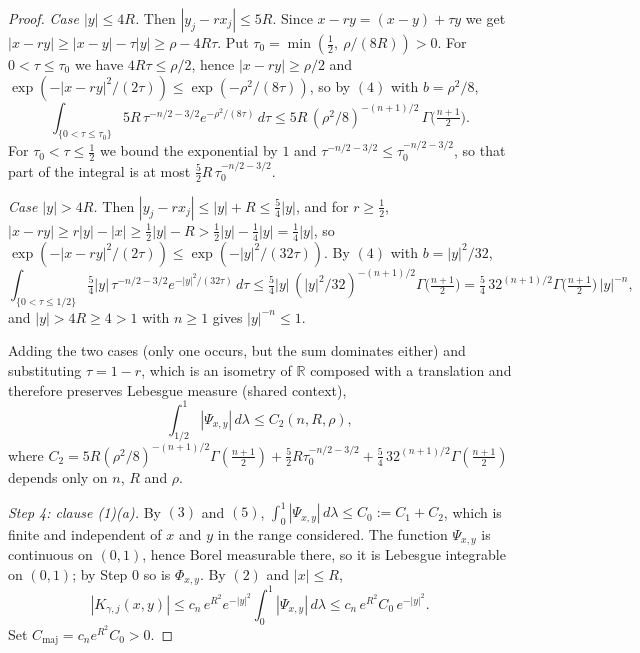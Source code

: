 \begin{proof}
\emph{Case $|y| \leq 4R$.}  Then $|y_j-rx_j| \leq 5R$.  Since
$x - ry = (x-y) + \tau y$ we get
$|x-ry| \geq |x-y| - \tau|y| \geq \rho - 4R\tau$.  Put
$\tau_0 = \min(\tfrac12,\ \rho/(8R)) > 0$.  For $0 < \tau \leq \tau_0$ we have
$4R\tau \leq \rho/2$, hence $|x-ry| \geq \rho/2$ and
$\exp(-|x-ry|^2/(2\tau)) \leq \exp(-\rho^2/(8\tau))$, so by $(4)$ with
$b = \rho^2/8$,
\[
  \int_{\{0<\tau\leq\tau_0\}} 5R\,\tau^{-n/2-3/2}e^{-\rho^2/(8\tau)}\,d\tau
    \leq 5R\,(\rho^2/8)^{-(n+1)/2}\,\Gamma\bigl(\tfrac{n+1}{2}\bigr) .
\]
For $\tau_0 < \tau \leq \tfrac12$ we bound the exponential by $1$ and
$\tau^{-n/2-3/2} \leq \tau_0^{-n/2-3/2}$, so that part of the integral is at
most $\tfrac52 R\,\tau_0^{-n/2-3/2}$.

\emph{Case $|y| > 4R$.}  Then $|y_j-rx_j| \leq |y| + R \leq \tfrac54|y|$, and
for $r \geq \tfrac12$,
$|x-ry| \geq r|y| - |x| \geq \tfrac12|y| - R > \tfrac12|y| - \tfrac14|y|
 = \tfrac14|y|$, so $\exp(-|x-ry|^2/(2\tau)) \leq \exp(-|y|^2/(32\tau))$.  By
$(4)$ with $b = |y|^2/32$,
\[
  \int_{\{0<\tau\leq 1/2\}}\tfrac54|y|\,\tau^{-n/2-3/2}e^{-|y|^2/(32\tau)}\,d\tau
    \leq \tfrac54|y|\,(|y|^2/32)^{-(n+1)/2}\Gamma\bigl(\tfrac{n+1}{2}\bigr)
    = \tfrac54\,32^{(n+1)/2}\Gamma\bigl(\tfrac{n+1}{2}\bigr)\,|y|^{-n} ,
\]
and $|y| > 4R \geq 4 > 1$ with $n \geq 1$ gives $|y|^{-n} \leq 1$.

Adding the two cases (only one occurs, but the sum dominates either) and
substituting $\tau = 1-r$, which is an isometry of $\mathbb{R}$ composed with a
translation and therefore preserves Lebesgue measure (shared context),
\begin{equation*}
  \int_{1/2}^{1}|\Psi_{x,y}|\,d\lambda \leq C_2(n,R,\rho) , \tag{5}
\end{equation*}
where $C_2 = 5R(\rho^2/8)^{-(n+1)/2}\Gamma(\tfrac{n+1}{2})
 + \tfrac52R\tau_0^{-n/2-3/2} + \tfrac54\,32^{(n+1)/2}\Gamma(\tfrac{n+1}{2})$
depends only on $n$, $R$ and $\rho$.

\emph{Step 4: clause (1)(a).}
By $(3)$ and $(5)$, $\int_0^1|\Psi_{x,y}|\,d\lambda \leq C_0 := C_1 + C_2$,
which is finite and independent of $x$ and $y$ in the range considered.  The
function $\Psi_{x,y}$ is continuous on $(0,1)$, hence Borel measurable there,
so it is Lebesgue integrable on $(0,1)$; by Step 0 so is $\Phi_{x,y}$.  By
$(2)$ and $|x| \leq R$,
\[
  |K_{\gamma,j}(x,y)|
    \leq c_n\,e^{R^2}e^{-|y|^2}\int_0^1|\Psi_{x,y}|\,d\lambda
    \leq c_n\,e^{R^2}C_0\,e^{-|y|^2} .
\]
Set $C_{\mathrm{maj}} = c_n e^{R^2}C_0 > 0$.


\end{proof}
